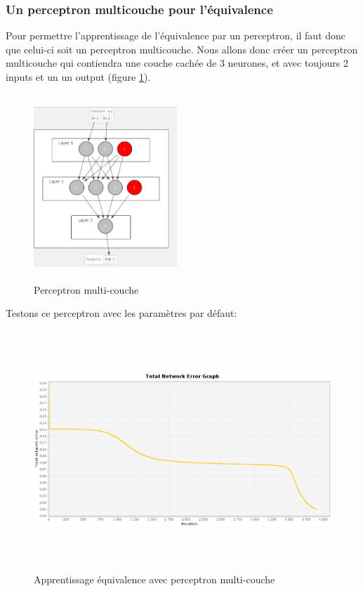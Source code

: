 \documentclass[twoside,openright,a4paper,11pt,french]{article}
\begin{document}
\clearpage


\subsubsection{Un perceptron multicouche pour l'équivalence}

Pour permettre l'apprentissage de l'équivalence par un perceptron, il faut donc que
celui-ci soit un perceptron multicouche.
Nous allons donc créer un perceptron multicouche qui contiendra une couche cachée de
3 neurones, et avec toujours 2 inputs et un un output (figure \ref{fig:eqmq}).

\begin{figure}[ht]
\centering
\includegraphics[width=5.4cm,height=7cm]{./pics/eq/perceptron_multi.eps}
\caption{Perceptron multi-couche}
\label{fig:eqmq}
\end{figure}

Testons ce perceptron avec les paramètres par défaut:

\begin{figure}[ht]
\centering
\includegraphics[width=12cm,height=9cm]{./pics/eq/multi_eq_def.eps}
\caption{Apprentissage équivalence avec perceptron multi-couche}
\end{figure}
\end{document}
